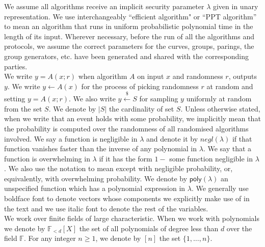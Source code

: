 \noindent We assume all algorithms receive an implicit security parameter $\lambda$ given in unary representation. 
We use interchangeably ``efficient algorithm" or ``PPT algorithm'' to mean an algorithm that runs in uniform probabilistic polynomial 
time in the length of its input. %
Wherever necessary, before the run of all the algorithms and protocols, we assume the correct parameters for the 
curves, groups, parings, the group generators, etc. have been generated and shared with the corresponding parties. \\

\noindent We write $y = A(x; r)$ when algorithm $A$ on input $x$ and randomness $r$, outputs $y$.
We write $y \leftarrow A(x)$ for the process of picking randomness $r$ at random and setting
$y = A(x; r)$. We also write $y \xleftarrow{\$}S$ for sampling $y$ uniformly at random from the set $S$. We denote by $|S|$ the cardinality of set $S$. 
Unless otherwise stated, when we write that an event holds with some probability, we implicitly mean 
that the probability is computed over the randomness of all randomised algorithms involved. 
We say a function is negligible in $\lambda$ and denote it by $\mathit{negl}(\lambda)$ if that function vanishes faster than the inverse of any polynomial in $\lambda$. 
We say that a function is overwhelming in $\lambda$ if it has the form $1- $ some function negligible in $\lambda$. 
We also use the notation \ewnp to mean except with negligible probability, or, equivalently, with overwhelming probability. We denote by $\mathsf{poly}(\lambda)$ an  
unspecified function which has a polynomial expression in $\lambda$. We generally use boldface font to denote vectors whose components we explicitly make use of in the text and 
we use italic font to denote the rest of the variables.\\

\noindent We work over finite fields of large characteristic. When we work with polynomials we denote by 
$\mathbb{F}_{<d}[X]$ the set of all polynomials of degree less than $d$ over the field $\mathbb{F}$. For any integer 
$n \geq 1$, we denote by $[n]$ the set $\{1, \ldots, n\}$.


